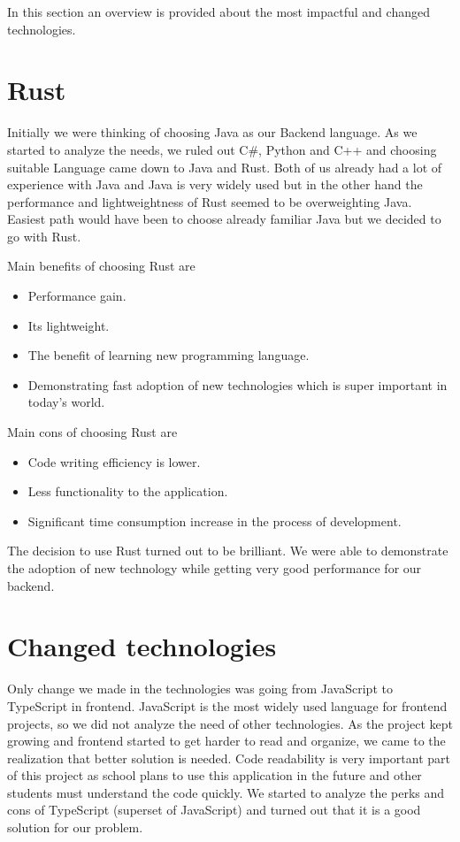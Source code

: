 In this section an overview is provided about the most impactful and changed technologies.

\section{Rust}\label{sec:rust}
Initially we were thinking of choosing Java as our Backend language.
As we started to analyze the needs, we ruled out C\#, Python and C++ and choosing suitable Language came down to Java and Rust.
Both of us already had a lot of experience with Java and Java is very widely used but in the other hand the performance and lightweightness of Rust seemed to be overweighting Java.
Easiest path would have been to choose already familiar Java but we decided to go with Rust.

Main benefits of choosing Rust are
\begin{itemize}
    \item Performance gain.
    \item Its lightweight.
    \item The benefit of learning new programming language.
    \item Demonstrating fast adoption of new technologies which is super important in today's world.
\end{itemize}

Main cons of choosing Rust are
\begin{itemize}
    \item Code writing efficiency is lower.
    \item Less functionality to the application.
    \item Significant time consumption increase in the process of development.
\end{itemize}

The decision to use Rust turned out to be brilliant.
We were able to demonstrate the adoption of new technology while getting very good performance for our backend.

\section{Changed technologies}\label{sec:changed-technologies}
Only change we made in the technologies was going from JavaScript to TypeScript in frontend.
JavaScript is the most widely used language for frontend projects, so we did not analyze the need of other technologies.
As the project kept growing and frontend started to get harder to read and organize, we came to the realization that better solution is needed.
Code readability is very important part of this project as school plans to use this application in the future and other students must understand the code quickly.
We started to analyze the perks and cons of TypeScript (superset of JavaScript) and turned out that it is a good solution for our problem.

